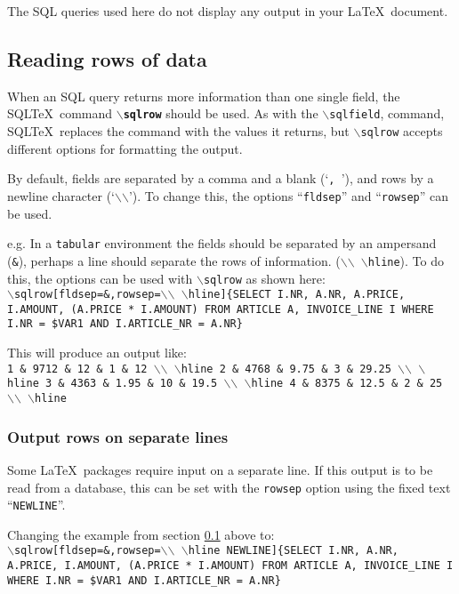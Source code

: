\documentclass{article}
\newcommand{\bs}{\ensuremath{\backslash}}
\newcommand{\vs}{\vspace{3mm}}
\begin{document}
\vs

The SQL queries used here do not display any output in your \LaTeX\ document.


\subsection{Reading rows of data}\label{sqlrow}

When an SQL query returns more information than one single field, the SQL\TeX\
command \texttt{\textbf{\bs sqlrow}} should be used. As with the \texttt{\bs sqlfield},
command, SQL\TeX\ replaces the command with the values it returns, but \texttt{\bs sqlrow}
accepts different options for formatting the output.

\vs

By default, fields are separated by a comma and a blank (`\texttt{,~}'), and rows by 
a newline character (`\texttt{\bs\bs}'). To change this, the options ``\texttt{fldsep}''
and ``\texttt{rowsep}'' can be used.

e.g. In a \texttt{tabular} environment the fields should be separated by an ampersand (\texttt{\&}),
perhaps a line should separate the rows of information. (\texttt{\bs\bs~\bs hline}).
To do this, the options can be used with \texttt{\bs sqlrow} as shown here: \\
\texttt{\bs sqlrow[fldsep=\&,rowsep=\bs\bs~\bs hline]\{SELECT I.NR, A.NR, 
A.PRICE, I.AMOUNT, (A.PRICE * I.AMOUNT) FROM ARTICLE A, INVOICE\_LINE I WHERE I.NR = \$VAR1 
AND I.ARTICLE\_NR = A.NR\}}

\vs

This will produce an output like: \\
\texttt{1 \& 9712 \& 12 \& 1 \& 12 \bs\bs~\bs hline 
2 \& 4768 \& 9.75 \& 3 \& 29.25 \bs\bs~\bs hline 
3 \& 4363 \& 1.95 \& 10 \& 19.5 \bs\bs~\bs hline 
4 \& 8375 \& 12.5 \& 2 \& 25 \bs\bs~\bs hline}

\subsubsection{Output rows on separate lines}

Some \LaTeX\ packages require input on a separate line. If this output is to be
read from a database, this can be set with the \texttt{rowsep} option using the
fixed text ``\texttt{NEWLINE}''.

Changing the example from section \ref{sqlrow} above to:\\
\texttt{\bs sqlrow[fldsep=\&,rowsep=\bs\bs~\bs hline NEWLINE]\{SELECT I.NR, A.NR, 
A.PRICE, I.AMOUNT, (A.PRICE * I.AMOUNT) FROM ARTICLE A, INVOICE\_LINE I WHERE I.NR = \$VAR1 
AND I.ARTICLE\_NR = A.NR\}}
\end{document}
